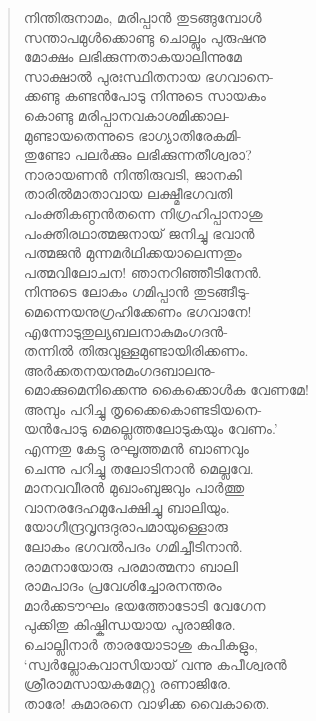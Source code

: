 \begin{verse}
നിന്തിരുനാമം, മരിപ്പാന്‍ തുടങ്ങുമ്പോള്‍\\
സന്താപമുള്‍ക്കൊണ്ടു ചൊല്ലും പുരുഷനു\\
മോക്ഷം ലഭിക്കുന്നതാകയാലിന്നുമേ\\
സാക്ഷാല്‍ പുരഃസ്ഥിതനായ ഭഗവാനെ-\\
ക്കണ്ടു കണ്ടന്‍പോടു നിന്നുടെ സായകം\\
കൊണ്ടു മരിപ്പാനവകാശമിക്കാല-\\
മുണ്ടായതെന്നുടെ ഭാഗ്യാതിരേകമി-\\
തുണ്ടോ പലര്‍ക്കും ലഭിക്കുന്നതീശ്വരാ?\\
നാരായണന്‍ നിന്തിരുവടി, ജാനകി\\
താരില്‍മാതാവായ ലക്ഷ്മീഭഗവതി\\
പംക്തികണ്ഠന്‍തന്നെ നിഗ്രഹിപ്പാനാശു\\
പംക്തിരഥാത്മജനായ് ജനിച്ചു ഭവാന്‍\\
പത്മജന്‍ മുന്നമര്‍ഥിക്കയാലെന്നതും\\
പത്മവിലോചന! ഞാനറിഞ്ഞീടിനേന്‍.\\
നിന്നുടെ ലോകം ഗമിപ്പാന്‍ തുടങ്ങീടു-\\
മെന്നെയനുഗ്രഹിക്കേണം ഭഗവാനേ!\\
എന്നോടുതുല്യബലനാകുമംഗദന്‍-\\
തന്നില്‍ തിരുവുള്ളമുണ്ടായിരിക്കണം.\\
അര്‍ക്കതനയനുമംഗദബാലനു-\\
മൊക്കുമെനിക്കെന്നു കൈക്കൊള്‍ക വേണമേ!\\
അമ്പും പറിച്ചു തൃക്കൈകൊണ്ടടിയനെ-\\
യന്‍പോടു മെല്ലെത്തലോടുകയും വേണം.’\\
എന്നതു കേട്ടു രഘൂത്തമന്‍ ബാണവും\\
ചെന്നു പറിച്ചു തലോടിനാന്‍ മെല്ലവേ.\\
മാനവവീരന്‍ മുഖാംബുജവും പാര്‍ത്തു\\
വാനരദേഹമുപേക്ഷിച്ചു ബാലിയും.\\
യോഗീന്ദ്രവൃന്ദദുരാപമായുള്ളൊരു\\
ലോകം ഭഗവല്‍പദം ഗമിച്ചീടിനാന്‍.\\
രാമനായോരു പരമാത്മനാ ബാലി\\
രാമപാദം പ്രവേശിച്ചോരനന്തരം\\
മാര്‍ക്കടൗഘം ഭയത്തോടോടി വേഗേന\\
പുക്കിതു കിഷ്കിന്ധയായ പുരാജിരേ.\\
ചൊല്ലിനാര്‍ താരയോടാശു കപികളും,\\
‘സ്വര്‍ല്ലോകവാസിയായ് വന്നു കപീശ്വരന്‍\\
ശ്രീരാമസായകമേറ്റു രണാജിരേ.\\
താരേ! കുമാരനെ വാഴിക്ക വൈകാതെ.\\

\end{verse}
